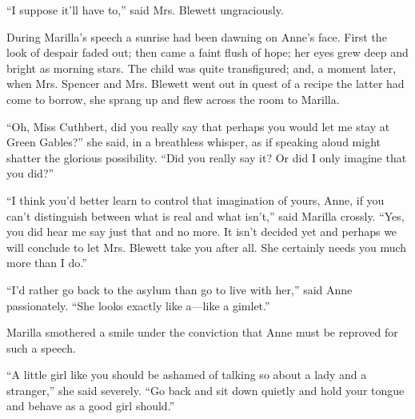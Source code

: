\documentclass[a4paper]{article}
\begin{document}
``I suppose it'll have to,'' \normalsize{said Mrs. Blewett} ungraciously.

During Marilla's speech a sunrise had been dawning on Anne's face. \large{First the look of despair faded out; then came a faint flush of hope; her eyes grew deep and bright as morning stars.} The child was quite transfigured; and, a moment later, when Mrs. Spencer and Mrs. Blewett went out in quest of a recipe the latter had come to borrow, she sprang up and flew across the room to Marilla.

``Oh, Miss Cuthbert, did you really say that perhaps you would let me stay at Green Gables?'' \Large{she said, in a breathless whisper, as if speaking aloud might shatter the glorious possibility.} ``Did you really say it? Or did I only imagine that you did?''

``I think you'd better learn to control that imagination of yours, Anne, if you can't distinguish between what is real and what isn't,'' said Marilla crossly. \LARGE{``Yes, you did hear me say just that and no more.} It isn't decided yet and perhaps we will conclude to let Mrs. Blewett take you after all. She certainly needs you much more than I do.''

``I'd rather go back to the \huge{asylum than go to live with her,'' said Anne passionately.} ``She looks exactly like a---like a gimlet.''

Marilla smothered \Huge{a smile under the conviction} that Anne must be reproved for such a speech.

``A little girl like you should be ashamed of talking so about a lady and a stranger,'' she said severely. ``Go back and sit down quietly and hold your tongue and behave as a good girl should.''
\end{document}

